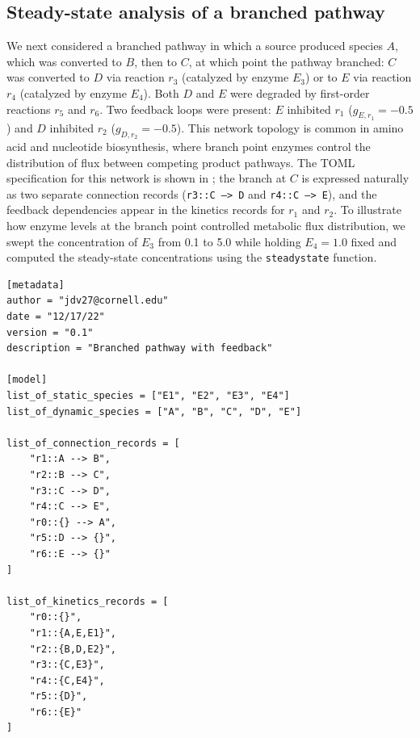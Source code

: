 \documentclass[11pt]{article}
\begin{document}
\subsection{Steady-state analysis of a branched pathway}\label{sec:ex-steadystate}
We next considered a branched pathway in which a source produced species $A$, which was converted to $B$, then to $C$, at which point the pathway branched: $C$ was converted to $D$ via reaction $r_3$ (catalyzed by enzyme $E_3$) or to $E$ via reaction $r_4$ (catalyzed by enzyme $E_4$). Both $D$ and $E$ were degraded by first-order reactions $r_5$ and $r_6$. Two feedback loops were present: $E$ inhibited $r_1$ ($g_{E,r_1} = -0.5$) and $D$ inhibited $r_2$ ($g_{D,r_2} = -0.5$). This network topology is common in amino acid and nucleotide biosynthesis, where branch point enzymes control the distribution of flux between competing product pathways. The TOML specification for this network is shown in ; the branch at $C$ is expressed naturally as two separate connection records (\texttt{r3::C --> D} and \texttt{r4::C --> E}), and the feedback dependencies appear in the kinetics records for $r_1$ and $r_2$. To illustrate how enzyme levels at the branch point controlled metabolic flux distribution, we swept the concentration of $E_3$ from 0.1 to 5.0 while holding $E_4 = 1.0$ fixed and computed the steady-state concentrations using the \texttt{steadystate} function.

\begin{lstlisting}[caption={TOML model file for a branched pathway with dual feedback inhibition.},label={lst:toml-branched},language={},float=ht]
[metadata]
author = "jdv27@cornell.edu"
date = "12/17/22"
version = "0.1"
description = "Branched pathway with feedback"

[model]
list_of_static_species = ["E1", "E2", "E3", "E4"]
list_of_dynamic_species = ["A", "B", "C", "D", "E"]

list_of_connection_records = [
    "r1::A --> B",
    "r2::B --> C",
    "r3::C --> D",
    "r4::C --> E",
    "r0::{} --> A",
    "r5::D --> {}",
    "r6::E --> {}"
]

list_of_kinetics_records = [
    "r0::{}",
    "r1::{A,E,E1}",
    "r2::{B,D,E2}",
    "r3::{C,E3}",
    "r4::{C,E4}",
    "r5::{D}",
    "r6::{E}"
]
\end{lstlisting}
\end{document}
